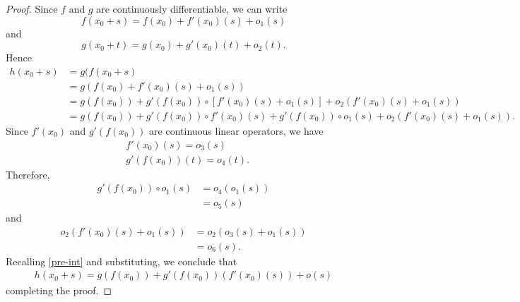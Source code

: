   \begin{proof} Since $f$ and $g$ are continuously differentiable, we can write
			\begin{equation*}
				f(x_0 + s) = f(x_0) + f'(x_0)(s) + o_{1}(s)
			\end{equation*}
			and
      \begin{equation*}
				g(x_0 + t) = g(x_0) + g'(x_0)(t)+ o_{2}(t).
			\end{equation*}
						Hence
			\begin{equation}
        \label{pre-order}
				\begin{split}
					h(x_0 + s) &= g(f(x_0 +s)
					\\
					&= g(f(x_0) + f'(x_0)(s) + o_{1}(s))
					\\
					&= g(f(x_0)) + g'(f(x_0)) \circ [f'(x_0)(s) + o_{1}(s)] 
					+ o_{2}(f'(x_0)(s) + o_{1}(s))
					\\
					&= g(f(x_0)) + g'(f(x_0)) \circ f'(x_0)(s) +
					g'(f(x_0)) \circ o_{1}(s) + o_{2}(f'(x_0)(s) + o_{1}(s)).
				\end{split}
			\end{equation}
      Since $f'(x_0)$
			and $g'(f(x_0))$ are continuous linear operators, we have
			\begin{equation*}
				\begin{split}
         &  f'(x_0)(s)
           = o_{3}(s)
					\\
					& g'(f(x_0))(t) = o_{4}(t).
				\end{split}
			\end{equation*}
      Therefore,
      \begin{equation*}
        \begin{split}
          g'(f(x_0)) \circ o_{1}(s)
          & = o_{4}(o_{1}(s))
          \\
          & = o_{5}(s)
        \end{split}
      \end{equation*}
      and
      \begin{equation*}
      \begin{split}
      o_{2}(f'(x_0)(s) + o_{1}(s))
      & = o_{2}(o_{3}(s) + o_{1}(s))
      \\
      & =o_{6}(s).
      \end{split}
      \end{equation*}
			Recalling \eqref{pre-int} and substituting, we conclude that
			\begin{equation*}
				\begin{split}
				h(x_0 + s) = g(f(x_0)) + g'(f(x_0))(f'(x_0)(s)) +
				o(s)
        \end{split}
        \end{equation*}
			 completing the proof. 
   \end{proof}
%
%
%
%
%

